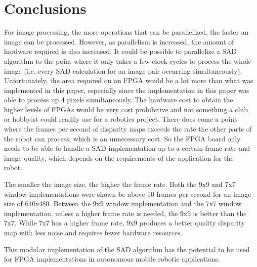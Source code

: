 \chapter{Conclusions}
\label{sec:concl}

For image processing, the more operations that can be parallelized, the faster an image can be processed. However, as parallelism is increased, the amount of hardware required is also increased. It could be possible to parallelize a SAD algorithm to the point where it only takes a few clock cycles to process the whole image (i.e. every SAD calculation for an image pair occurring simultaneously). Unfortunately, the area required on an FPGA would be a lot more than what was implemented in this paper, especially since the implementation in this paper was able to process up 4 pixels simultaneously. The hardware cost to obtain the higher levels of FPGAs would be very cost prohibitive and not something a club or hobbyist could readily use for a robotics project. There does come a point where the frames per second of disparity maps exceeds the rate the other parts of the robot can process, which is an unnecessary cost. So the FPGA board only needs to be able to handle a SAD implementation up to a certain frame rate and image quality, which depends on the requirements of the application for the robot.

The smaller the image size, the higher the frame rate. Both the 9x9 and 7x7 window implementations were shown be above 10 frames per second for an image size of 640x480. Between the 9x9 window implementation and the 7x7 window implementation, unless a higher frame rate is needed, the 9x9 is better than the 7x7. While 7x7 has a higher frame rate, 9x9 produces a better quality disparity map with less noise and requires fewer hardware resources.

This modular implementation of the SAD algorithm has the potential to be used for FPGA implementations in autonomous mobile robotic applications.